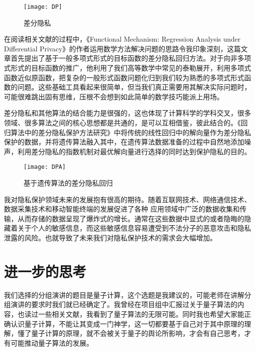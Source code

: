 \documentclass{article}
\begin{document}
\begin{figure}[h!]
\centering
\texttt{[image: DP]}
\caption{差分隐私}
\label{fig:DP}
\end{figure}
\par 在阅读相关文献的过程中，《Functional Mechanism: Regression Analysis under Differential Privacy》\citep{2012arXiv1208.0219Z}的作者运用数学方法解决问题的思路令我印象深刻，这篇文章首先提出了基于一般多项式形式的目标函数的差分隐私回归方法。对于向非多项式形式的目标函数的推广，他利用了我们高等数学中常见的泰勒展开，利用多项式函数近似原函数，把复杂的一般形式函数问题化归到我们较为熟悉的多项式形式函数的问题。这些基础工具看起来很简单，但当我们真正需要用其解决实际问题时，可能很难跳出固有思维，压根不会想到如此简单的数学技巧能派上用场。

\par
差分隐私和其他算法的结合能力是很强的，这也体现了计算科学的学科交叉，很多领域、很多算法之间的核心思想都是共通的，是可以互相借鉴，彼此结合的。《回归算法中的差分隐私保护方法研究》\citep{chen}中将传统的线性回归中的解向量作为差分隐私保护的数据，并将遗传算法融入其中，在遗传算法数据准备的过程中自然地添加噪声，利用差分隐私的指数机制对最优解向量进行选择的同时达到保护隐私的目的。
\begin{figure}[h!]
\centering
\texttt{[image: DPA]}
\caption{基于遗传算法的差分隐私回归}
\label{fig:DP}
\end{figure}


\par
我对隐私保护领域未来的发展抱有很高的期待。随着互联网技术、网络通信技术、数据采集技术和移动智能终端的发展促进了各种
应用领域中广泛的数据收集和传输，从而存储的数据呈现了爆炸式的增长。通常在这些数据中显式的或者隐晦的隐藏着关于个人的敏感信息，而这些敏感信息容易遭受到不法分子的恶意攻击和隐私泄露的风险。也就导致了未来我们对隐私保护技术的需求会大幅增加。










\section{进一步的思考}
我们选择的分组演讲的题目是量子计算，这个选题是我建议的，可能老师在讲解分组演讲的要求时我们就已经确定了。我曾经在项目组中汇报过关于量子算法的内容，也读过一些相关文献，我看到了量子算法的无限可能。同时我也希望大家能正确认识量子计算，不能让其变成一门神学，这一切都要基于自己对于其中原理的理解，懂了量子计算的原理，就不会被关于量子的舆论所影响，才会有自己思考，才有可能推动量子算法的发展。
\end{document}
